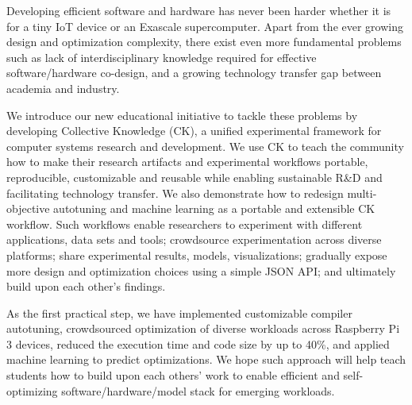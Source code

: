 Developing efficient software and hardware has never been harder whether it is
for a tiny IoT device or an Exascale supercomputer.
%
Apart from the ever growing design and optimization complexity, there exist even
more fundamental problems such as lack of interdisciplinary knowledge required
for effective software/hardware co-design, and a growing technology transfer
gap between academia and industry.
%

We introduce our new educational initiative to tackle these problems by
developing Collective Knowledge (CK), a unified experimental framework for
computer systems research and development.
%
We use CK to teach the community how to make their research artifacts and
experimental workflows portable, reproducible, customizable and reusable while
enabling sustainable R\&D and facilitating technology transfer.
%
We also demonstrate how to redesign multi-objective autotuning and machine learning
as a portable and extensible CK workflow.
%
Such workflows enable researchers to experiment with different applications,
data sets and tools; crowdsource experimentation across diverse platforms;
share experimental results, models, visualizations; gradually expose more
design and optimization choices using a simple JSON API; and ultimately build
upon each other's findings.
%

As the first practical step, we have implemented customizable 
compiler autotuning, crowdsourced optimization 
of diverse workloads across Raspberry Pi 3 devices,
reduced the execution time and code size by up to 40\%,
and applied machine learning to predict optimizations.
%
We hope such approach will help teach students how to build 
upon each others' work to enable efficient and self-optimizing
software/hardware/model stack for emerging workloads.
